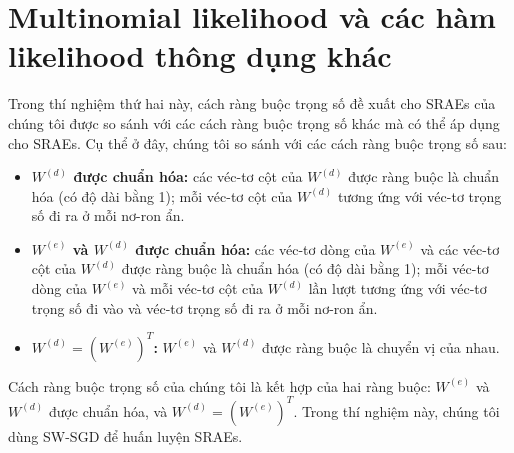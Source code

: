 \section{Multinomial likelihood và các hàm likelihood thông dụng khác}
Trong thí nghiệm thứ hai này, cách ràng buộc trọng số đề xuất cho SRAEs của chúng tôi được so sánh với các cách ràng buộc trọng số khác mà có thể áp dụng cho SRAEs. Cụ thể ở đây, chúng tôi so sánh với các cách ràng buộc trọng số sau:
\begin{itemize}
	\item \textbf{$W^{(d)}$ được chuẩn hóa:} các véc-tơ cột của $W^{(d)}$ được ràng buộc là chuẩn hóa (có độ dài bằng 1); mỗi véc-tơ cột của $W^{(d)}$ tương ứng với véc-tơ trọng số đi ra ở mỗi nơ-ron ẩn.
	\item \textbf{$W^{(e)}$ và $W^{(d)}$ được chuẩn hóa:} các véc-tơ dòng của $W^{(e)}$ và các véc-tơ cột của $W^{(d)}$ được ràng buộc là chuẩn hóa (có độ dài bằng 1); mỗi véc-tơ dòng của $W^{(e)}$ và mỗi véc-tơ cột của $W^{(d)}$ lần lượt tương ứng với véc-tơ trọng số đi vào và véc-tơ trọng số đi ra ở mỗi nơ-ron ẩn.
	\item \textbf{$W^{(d)} = (W^{(e)})^T$:} $W^{(e)}$ và $W^{(d)}$ được ràng buộc là chuyển vị của nhau.
\end{itemize}
Cách ràng buộc trọng số của chúng tôi là kết hợp của hai ràng buộc: $W^{(e)}$ và $W^{(d)}$ được chuẩn hóa, và $W^{(d)} = (W^{(e)})^T$. Trong thí nghiệm này, chúng tôi dùng SW-SGD để huấn luyện SRAEs.

